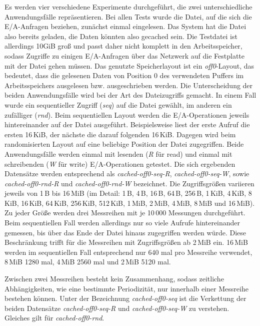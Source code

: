 \documentclass[
	twoside,
	12pt,
	a4paper,
	BCOR10mm,
	DIV14,
	listof=totoc,
	bibliography=totoc,
	headsepline
]{scrreprt}
\begin{document}
Es werden vier verschiedene Experimente durchgeführt, die zwei unterschiedliche Anwendungsfälle repräsentieren.
Bei allen Tests wurde die Datei, auf die sich die E/A-Anfragen beziehen, zunächst einmal eingelesen. Das System hat die Datei also bereits geladen, die Daten könnten also gecached sein.
Die Testdatei ist allerdings 10GiB groß und passt daher nicht komplett in den Arbeitsspeicher, sodass Zugriffe zu einigen E/A-Anfragen über das Netzwerk auf die Festplatte mit der Datei gehen müssen.
Das genutzte Speicherlayout ist ein \textit{off0}-Layout, das bedeutet, dass die gelesenen Daten von Position 0 des verwendeten Puffers im Arbeitsspeichers ausgelesen bzw. ausgeschrieben werden.
Die Unterscheidung der beiden Anwendungsfälle wird bei der Art des Dateizugriffs gemacht.
In einem Fall wurde ein sequentieller Zugriff (\textit{seq}) auf die Datei gewählt, im anderen ein zufälliger (\textit{rnd}).
Beim sequentiellen Layout werden die E/A-Operationen jeweils hintereinander auf der Datei ausgeführt. Beispielsweise liest der erste Aufruf die ersten 16\,KiB, der nächste die darauf folgenden 16\,KiB.
Dagegen wird beim randomisierten Layout auf eine beliebige Position der Datei zugegriffen.
Beide Anwendungsfälle werden einmal mit lesenden (\textit{R} für read) und einmal mit schreibenden (\textit{W} für write) E/A-Operationen getestet.
Die sich ergebenden Datensätze werden entsprechend als \textit{cached-off0-seq-R}, \textit{cached-off0-seq-W}, sowie \textit{cached-off0-rnd-R} und \textit{cached-off0-rnd-W} bezeichnet.
Die Zugriffsgrößen variieren jeweils von 1\,B bis 16\,MiB (im Detail: 1\,B, 4\,B, 16\,B, 64\,B, 256\,B, 1\,KiB, 4\,KiB, 8\,KiB, 16\,KiB, 64\,KiB, 256\,KiB, 512\,KiB, 1\,MiB, 2\,MiB, 4\,MiB, 8\,MiB und 16\,MiB).
Zu jeder Größe werden drei Messreihen mit je 10\,000 Messungen durchgeführt.
Beim sequentiellen Fall werden allerdings nur so viele Aufrufe hintereinander gemessen, bis über das Ende der Datei hinaus zugegriffen werden würde.
Diese Beschränkung trifft für die Messreihen mit Zugriffsgrößen ab 2\,MiB ein. 16\,MiB werden im sequentiellen Fall entsprechend nur 640 mal pro Messreihe verwendet, 8\,MiB 1280 mal, 4\,MiB 2560 mal und 2\,MiB 5120 mal.\medskip

Zwischen zwei Messreihen besteht kein Zusammenhang, sodass zeitliche Abhängigkeiten, wie eine bestimmte Periodizität, nur innerhalb einer Messreihe bestehen können.  
Unter der Bezeichnung \textit{cached-off0-seq} ist die Verkettung der beiden Datensätze \textit{cached-off0-seq-R} und \textit{cached-off0-seq-W} zu verstehen. Gleiches gilt für \textit{cached-off0-rnd}.\medskip
\end{document}
